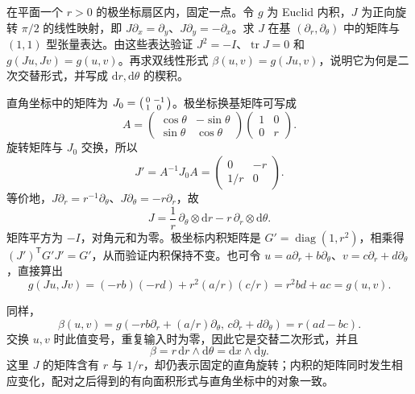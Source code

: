 \begin{exercise}
	\label{g1:exr:1202-polar-rotation}
	在平面一个 \(r>0\) 的极坐标扇区内，固定一点。令 \(g\) 为 Euclid 内积，\(J\) 为正向旋转 \(\pi/2\) 的线性映射，即 \(J\partial_x=\partial_y\)、\(J\partial_y=-\partial_x\)。求 \(J\) 在基 \((\partial_r,\partial_\theta)\) 中的矩阵与 \((1,1)\) 型张量表达。由这些表达验证 \(J^2=-I\)、\(\operatorname{tr}J=0\) 和 \(g(Ju,Jv)=g(u,v)\)。再求双线性形式 \(\beta(u,v)=g(Ju,v)\)，说明它为何是二次交替形式，并写成 \(\mathrm{d}r,\mathrm{d}\theta\) 的楔积。
\end{exercise}
\begin{solution}
	直角坐标中的矩阵为 \(J_0=\begin{psmallmatrix}0&-1\\1&0\end{psmallmatrix}\)。极坐标换基矩阵可写成
	\[
		A=\begin{pmatrix}\cos\theta&-\sin\theta\\\sin\theta&\cos\theta\end{pmatrix}
		\begin{pmatrix}1&0\\0&r\end{pmatrix}.
	\]
	旋转矩阵与 \(J_0\) 交换，所以
	\[
		J'=A^{-1}J_0A=\begin{pmatrix}0&-r\\1/r&0\end{pmatrix}.
	\]
	等价地，\(J\partial_r=r^{-1}\partial_\theta\)、\(J\partial_\theta=-r\partial_r\)，故
	\[
		J=\frac1r\,\partial_\theta\otimes\mathrm{d}r
		-r\,\partial_r\otimes\mathrm{d}\theta.
	\]
	矩阵平方为 \(-I\)，对角元和为零。极坐标内积矩阵是 \(G'=\operatorname{diag}(1,r^2)\)，相乘得 \((J')^{\mathsf T}G'J'=G'\)，从而验证内积保持不变。也可令 \(u=a\partial_r+b\partial_\theta\)、\(v=c\partial_r+d\partial_\theta\)，直接算出
	\[
		g(Ju,Jv)=(-rb)(-rd)+r^2(a/r)(c/r)=r^2bd+ac=g(u,v).
	\]

	同样，
	\[
		\beta(u,v)=g(-rb\partial_r+(a/r)\partial_\theta,\,
		c\partial_r+d\partial_\theta)=r(ad-bc).
	\]
	交换 \(u,v\) 时此值变号，重复输入时为零，因此它是交替二次形式，并且
	\[
		\beta=r\,\mathrm{d}r\wedge\mathrm{d}\theta
		=\mathrm{d}x\wedge\mathrm{d}y.
	\]
	这里 \(J\) 的矩阵含有 \(r\) 与 \(1/r\)，却仍表示固定的直角旋转；内积的矩阵同时发生相应变化，配对之后得到的有向面积形式与直角坐标中的对象一致。
\end{solution}

